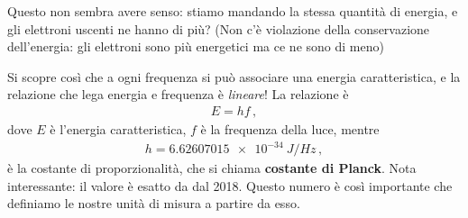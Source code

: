 \documentclass{article}
\begin{document}
Questo non sembra avere senso: stiamo mandando la stessa quantità di energia, e gli elettroni uscenti ne hanno di più? 
(Non c'è violazione della conservazione dell'energia: gli elettroni sono più energetici ma ce ne sono di meno)

Si scopre così che a ogni frequenza si può associare una energia caratteristica, e la relazione che lega energia e frequenza è \emph{lineare}! La relazione è 
%
\begin{align}
E = h f
\,,
\end{align}
%
dove \(E\) è l'energia caratteristica, \(f\) è la frequenza della luce, mentre 
%
\begin{align}
h = \SI{6.62607015e-34}{J / Hz}
\,,
\end{align}
%
è la costante di proporzionalità, che si chiama \textbf{costante di Planck}. 
Nota interessante: il valore è esatto da dal 2018. Questo numero è così importante che definiamo le nostre unità di misura a partire da esso.



\printbibliography
\end{document}
